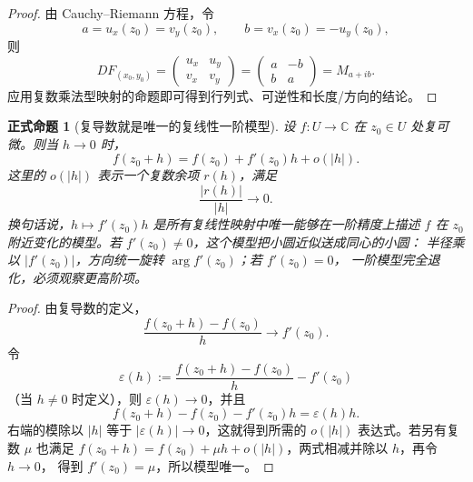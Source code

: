\documentclass[UTF8,fontset=none,a4paper,11pt]{ctexart}
\theoremstyle{foundation-definition}
\theoremstyle{foundation-theorem}
\theoremstyle{foundation-proposition}
\newtheorem{proposition}[definition]{正式命题}
\theoremstyle{foundation-example}
\theoremstyle{foundation-remark}
\theoremstyle{foundation-theorem}
\begin{document}
\begin{proof}
由 Cauchy--Riemann 方程，令
\[
a=u_x(z_0)=v_y(z_0),\qquad b=v_x(z_0)=-u_y(z_0),
\]
则
\[
DF_{(x_0,y_0)}
=\begin{pmatrix}u_x&u_y\\v_x&v_y\end{pmatrix}
=\begin{pmatrix}a&-b\\b&a\end{pmatrix}
=M_{a+ib}.
\]
应用复数乘法型映射的命题即可得到行列式、可逆性和长度/方向的结论。
\end{proof}

\begin{proposition}[复导数就是唯一的复线性一阶模型]\label{prop:complex-first-order-model}
设 \(f:U\to\mathbb C\) 在 \(z_0\in U\) 处复可微。则当 \(h\to0\) 时，
\[
  f(z_0+h)=f(z_0)+f'(z_0)h+o(|h|).
\]
这里的 \(o(|h|)\) 表示一个复数余项 \(r(h)\)，满足
\[
  \frac{|r(h)|}{|h|}\longrightarrow0.
\]
换句话说，\(h\mapsto f'(z_0)h\) 是所有复线性映射中唯一能够在一阶精度上描述
\(f\) 在 \(z_0\) 附近变化的模型。若 \(f'(z_0)\ne0\)，这个模型把小圆近似送成同心的小圆：
半径乘以 \(|f'(z_0)|\)，方向统一旋转 \(\arg f'(z_0)\)；若 \(f'(z_0)=0\)，
一阶模型完全退化，必须观察更高阶项。
\end{proposition}

\begin{proof}
由复导数的定义，
\[
  \frac{f(z_0+h)-f(z_0)}{h}\longrightarrow f'(z_0).
\]
令
\[
  \varepsilon(h):=
  \frac{f(z_0+h)-f(z_0)}{h}-f'(z_0)
\]
（当 \(h\ne0\) 时定义），则 \(\varepsilon(h)\to0\)，并且
\[
  f(z_0+h)-f(z_0)-f'(z_0)h=\varepsilon(h)h.
\]
右端的模除以 \(|h|\) 等于 \(|\varepsilon(h)|\to0\)，这就得到所需的
\(o(|h|)\) 表达式。若另有复数 \(\mu\) 也满足
\(f(z_0+h)=f(z_0)+\mu h+o(|h|)\)，两式相减并除以 \(h\)，再令 \(h\to0\)，
得到 \(f'(z_0)=\mu\)，所以模型唯一。
\end{proof}
\end{document}

